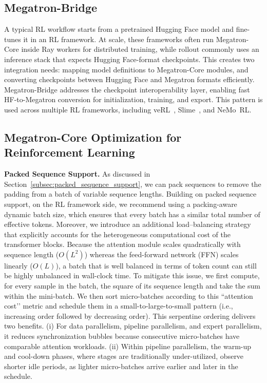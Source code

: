 \subsection{Megatron-Bridge}
A typical RL workflow starts from a pretrained Hugging Face model and fine-tunes it in an RL framework. At scale, these frameworks often run Megatron-Core inside Ray workers for distributed training, while rollout commonly uses an inference stack that expects Hugging Face-format checkpoints. This creates two integration needs: mapping model definitions to Megatron-Core modules, and converting checkpoints between Hugging Face and Megatron formats efficiently. Megatron-Bridge addresses the checkpoint interoperability layer, enabling fast HF-to-Megatron conversion for initialization, training, and export. This pattern is used across multiple RL frameworks, including veRL~\cite{sheng2024hybridflow}, Slime~\cite{slime_github}, and NeMo~RL.

\subsection{Megatron-Core Optimization for Reinforcement Learning}
\textbf{Packed Sequence Support.} As discussed in Section~\ref{subsec:packed_sequence_support}, we can pack sequences to remove the padding from a batch of variable sequence lengths. Building on packed sequence support, on the RL framework side, we recommend using a packing-aware dynamic batch size, which ensures that every batch has a similar total number of effective tokens. Moreover, we introduce an additional load–balancing strategy that explicitly accounts for the heterogeneous computational cost of the transformer blocks. Because the attention module scales quadratically with sequence length (\(O(L^{2})\)) whereas the feed-forward network (FFN) scales linearly (\(O(L)\)), a batch that is well balanced in terms of token count can still be highly unbalanced in wall-clock time. To mitigate this issue, we first compute, for every sample in the batch, the square of its sequence length and take the sum within the mini-batch. We then sort micro-batches according to this ``attention cost’’ metric and schedule them in a small-to-large-to-small pattern (i.e., increasing order followed by decreasing order).
This serpentine ordering delivers two benefits. (i) For data parallelism, pipeline parallelism, and expert parallelism, it reduces synchronization bubbles because consecutive micro-batches have comparable attention workloads. (ii) Within pipeline parallelism, the warm-up and cool-down phases, where stages are traditionally under-utilized, observe shorter idle periods, as lighter micro-batches arrive earlier and later in the schedule.

